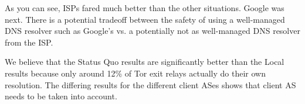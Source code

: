 As you can see, ISPs fared much better than the other situations. Google was next. There is a potential 
tradeoff between the safety of using a well-managed DNS resolver such as Google's vs. 
a potentially not as well-managed DNS resolver from the ISP.  

We believe that the Status Quo results are significantly better than the 
Local results because only around 12\% of Tor exit relays actually do their own resolution.
The differing results for the different client ASes shows that client AS needs to be 
taken into account. 
